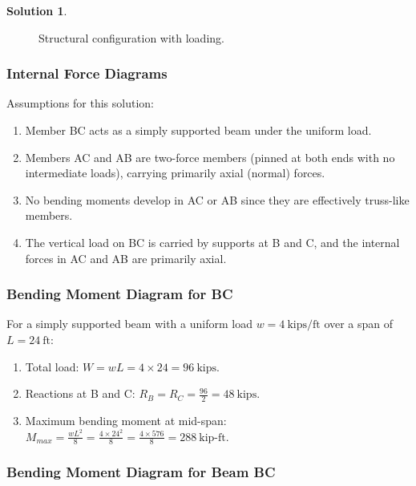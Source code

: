 \documentclass[12pt]{article}
\theoremstyle{definition} %
\newtheorem{solution}{Solution}
\theoremstyle{plain} %
\begin{document}
\begin{solution}
\begin{enumerate}
\begin{figure}[h!]
\begin{tikzpicture}[scale=0.4,>=stealth]
        \end{tikzpicture}
        \label{f1}
        \caption{Structural configuration with loading.}
        \end{figure}
                
        \subsubsection*{Internal Force Diagrams}
        
        Assumptions for this solution:
        \begin{enumerate}
        \item Member BC acts as a simply supported beam under the uniform load.
        \item Members AC and AB are two-force members (pinned at both ends with no intermediate loads), carrying primarily axial (normal) forces.
        \item No bending moments develop in AC or AB since they are effectively truss-like members.
        \item The vertical load on BC is carried by supports at B and C, and the internal forces in AC and AB are primarily axial.
        
   
        \end{enumerate}
                \subsubsection*{Bending Moment Diagram for BC}
        For a simply supported beam with a uniform load $w = 4~\text{kips/ft}$ over a span of $L = 24~\text{ft}$:
        \begin{enumerate}
            \item  Total load: $W = wL = 4 \times 24 = 96~\text{kips}$.
        \item Reactions at B and C: $R_B = R_C = \frac{96}{2} = 48~\text{kips}$.
        \item Maximum bending moment at mid-span: $M_{max} = \frac{wL^2}{8} = \frac{4 \times 24^2}{8} = \frac{4 \times 576}{8} = 288~\text{kip-ft}$.
        

        \end{enumerate}
        \subsubsection*{Bending Moment Diagram for Beam BC}
        \begin{figure}[h!]
            \centering
\end{figure}
\end{enumerate}
\end{solution}
\end{document}
